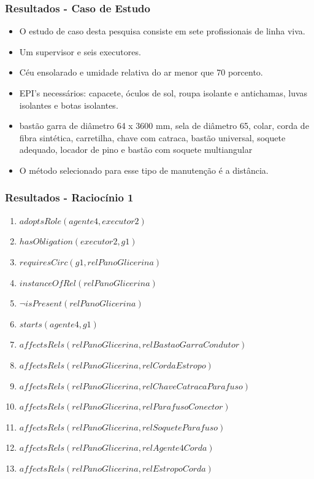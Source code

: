 \documentclass{beamer}
\begin{document}
\begin{frame}
	\frametitle{Resultados - Caso de Estudo}
	\begin{itemize}
		\item O estudo de caso desta pesquisa consiste em sete profissionais de linha viva.
		\item Um supervisor e seis executores.
		\item Céu ensolarado e umidade relativa do ar menor que 70 porcento.
		\item EPI's necessários: capacete, óculos de sol, roupa isolante e antichamas, luvas isolantes e botas isolantes.
		\item  bastão garra de diâmetro 64 x 3600 mm, sela de diâmetro 65, colar, corda de fibra sintética, carretilha, chave com catraca, bastão universal, soquete adequado, locador de pino e bastão com soquete multiangular
		\item O método selecionado para esse tipo de manutenção é a distância.
	\end{itemize}
\end{frame}
\begin{frame}
	\frametitle{Resultados - Raciocínio 1}
	\begin{enumerate}
		\item $adoptsRole(agente4,executor2)$ 
		\item $hasObligation(executor2,g1)$
		\item $requiresCirc(g1,relPanoGlicerina)$
		\item $instanceOfRel(relPanoGlicerina)$ 
		\item $\neg isPresent(relPanoGlicerina)$
		\item $starts(agente4,g1)$
		\item $affectsRels(relPanoGlicerina,relBastaoGarraCondutor)$
		\item $affectsRels(relPanoGlicerina,relCordaEstropo)$  
		\item $affectsRels(relPanoGlicerina,relChaveCatracaParafuso)$
		\item $affectsRels(relPanoGlicerina,relParafusoConector)$ 
		\item $affectsRels(relPanoGlicerina,relSoqueteParafuso)$ 
		\item $affectsRels(relPanoGlicerina,relAgente4Corda)$ 
		\item $affectsRels(relPanoGlicerina,relEstropoCorda)$	
	\end{enumerate}
\end{frame}
\end{document}

